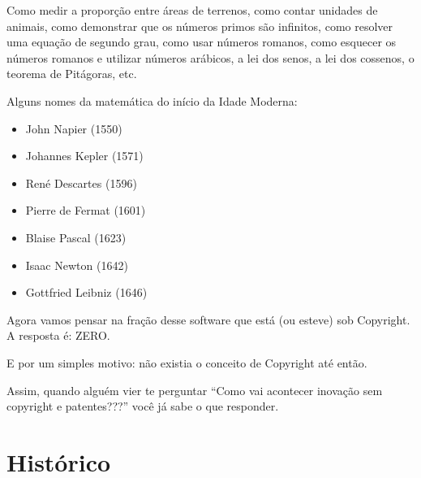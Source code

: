 \documentclass[serif,mathserif]{beamer}
\begin{document}
\begin{frame}
  Como medir a proporção entre áreas de terrenos, \pause como contar unidades de animais, \pause
  como demonstrar que os números primos são infinitos, \pause como resolver uma equação de
  segundo grau, \pause como usar números romanos, \pause como esquecer os números romanos e utilizar
  números arábicos, \pause a lei dos senos, \pause a lei dos cossenos, \pause o teorema de Pitágoras, \pause etc.\pause
  
  \vspace{5mm} %
  Alguns nomes da matemática do início da Idade Moderna: \\ 
   \pause
  \begin{itemize}[<+->]
    \item John Napier (1550)
    \item Johannes Kepler (1571)
    \item René Descartes (1596)
    \item Pierre de Fermat (1601)
    \item Blaise Pascal (1623)
    \item Isaac Newton (1642)
    \item Gottfried Leibniz (1646)
  \end{itemize}

\end{frame}

\begin{frame}
  Agora vamos pensar na fração desse software que está (ou esteve) sob Copyright. \pause A resposta é: ZERO.\pause
  
  E por um simples motivo: não existia o conceito de Copyright até então. \pause
  
  \vspace{5mm} %
  Assim, quando alguém vier te perguntar ``Como vai acontecer inovação
  sem copyright e patentes???'' você já sabe o que responder.
\end{frame}
  
  
\section{Histórico}  %
  
\end{document}
